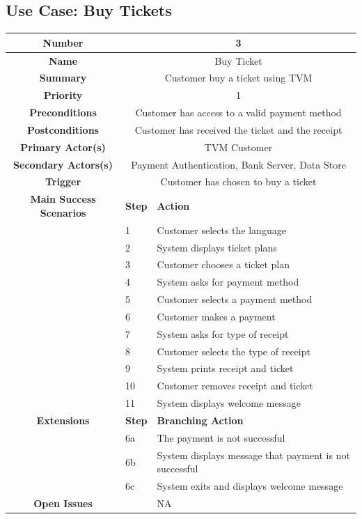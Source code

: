 \documentclass[a4paper,12pt]{report}
\begin{document}
\subsection{Use Case: Buy Tickets}

\begin{tabular}{ | c | p{2cm} | p{7cm} |}
	
	\hline
	\textbf{Number} & \multicolumn{2}{c|}{3}  \\
	\hline
	\textbf{Name} & \multicolumn{2}{c|}{Buy Ticket}  \\
	\hline
	\textbf{Summary} & \multicolumn{2}{c|}{Customer buy a ticket using TVM}  \\
	\hline
	\textbf{Priority} & \multicolumn{2}{c|}{1}  \\
	\hline
	\textbf{Preconditions} & \multicolumn{2}{c|}{Customer has access to a valid payment method}  \\
	\hline
	\textbf{Postconditions} & \multicolumn{2}{c|}{Customer has received the ticket and the receipt}  \\
	\hline
	\textbf{Primary Actor(s)} & \multicolumn{2}{c|}{TVM Customer}  \\
	\hline
	\textbf{Secondary Actors(s)} & \multicolumn{2}{c|}{Payment Authentication, Bank Server, Data Store}  \\
	\hline
	\textbf{Trigger} & \multicolumn{2}{c|}{Customer has chosen to buy a ticket}  \\
	\hline
	\textbf{Main Success Scenarios} & \textbf{Step} & \textbf{Action} \\
	\hline
	& 1 & Customer selects the language \\ 
	\hline
	&  2  & System displays ticket plans \\
	\hline
	&  3  & Customer chooses a ticket plan \\
	\hline
	&  4  & System asks for payment method \\
	\hline
	&  5  & Customer selects a payment method \\
	\hline
	&  6  & Customer makes a payment \\
	\hline
	&  7  & System asks for type of receipt \\
	\hline
	&  8  & Customer selects the type of receipt \\
	\hline
	&  9  & System prints receipt and ticket \\
	\hline
	&  10  & Customer removes receipt and ticket \\
	\hline
	&  11  & System displays welcome message \\
	\hline
	\textbf{Extensions} & \textbf{Step} & \textbf{Branching Action} \\
	\hline
	&  6a  & The payment is not successful \\
	\hline
	&  6b  & System displays message that payment is not successful \\
	\hline
	&  6c  & System exits and displays welcome message \\
	\hline
	\textbf{Open Issues} &    & NA \\
	\hline
	
\end{tabular}
\end{document}
